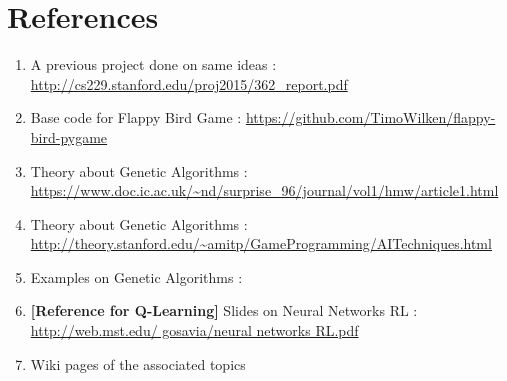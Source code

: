 \documentclass{article}
\begin{document}
\section{References}
\begin{enumerate}
\item A previous project done on same ideas : \url{http://cs229.stanford.edu/proj2015/362_report.pdf}
\item Base code for Flappy Bird Game : \url{https://github.com/TimoWilken/flappy-bird-pygame}
\item Theory about Genetic Algorithms : \url{https://www.doc.ic.ac.uk/~nd/surprise_96/journal/vol1/hmw/article1.html}
\item Theory about Genetic Algorithms : \url{http://theory.stanford.edu/~amitp/GameProgramming/AITechniques.html}
\item Examples on Genetic Algorithms :
\item \textbf{[Reference for Q-Learning]} Slides on Neural Networks RL : \url{http://web.mst.edu/ gosavia/neural networks RL.pdf}  
\item Wiki pages of the associated topics
\end{enumerate}
\end{document}
